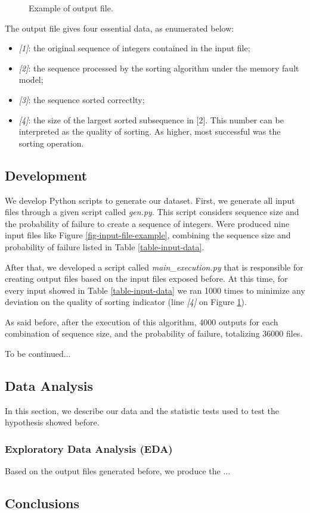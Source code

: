 \begin{figure}[H]
    \centering
    \fbox{
    \theverbbox
    }
    \caption{Example of output file.}
    \label{fig-output-file-example}
\end{figure}

The output file gives four essential data, as enumerated below:
\begin{itemize}
    \item \textit{[1]}: the original sequence of integers contained in the input file;
    \item \textit{[2]}: the sequence processed by the sorting algorithm under the memory fault model;
    \item \textit{[3]}: the sequence sorted correctlty;
    \item \textit{[4]}: the size of the largest sorted subsequence in [2]. This number can be interpreted as the quality of sorting. As higher, most successful was the sorting operation.
\end{itemize}

\subsection{Development}

We develop Python scripts to generate our dataset. First, we generate all input files through a given script called \textit{gen.py}. This script considers sequence size and the probability of failure to create a sequence of integers. Were produced nine input files like Figure \ref{fig-input-file-example}, combining the sequence size and probability of failure listed in Table \ref{table-input-data}.

After that, we developed a script called \textit{main\_execution.py} that is responsible for creating output files based on the input files exposed before. At this time, for every input showed in Table \ref{table-input-data} we ran 1000 times to minimize any deviation on the quality of sorting indicator (line \textit{[4]} on Figure \ref{fig-output-file-example}).

As said before, after the execution of this algorithm, 4000 outputs for each combination of sequence size, and the probability of failure, totalizing 36000 files.

To be continued...

\subsection{Data Analysis}

In this section, we describe our data and the statistic tests used to test the hypothesis showed before.

\subsubsection{Exploratory Data Analysis (EDA)}

Based on the output files generated before, we produce the ...



\subsection{Conclusions}

